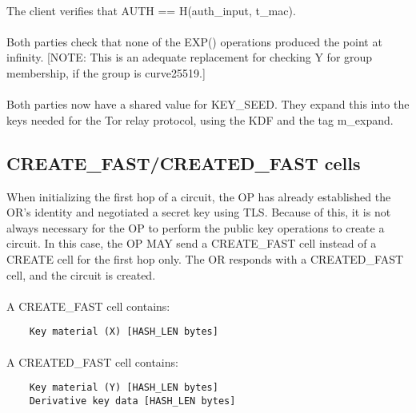 \paragraph{}
The client verifies that AUTH == H(auth\_input, t\_mac).

\paragraph{}
Both parties check that none of the EXP() operations produced the
point at infinity. [NOTE: This is an adequate replacement for
checking Y for group membership, if the group is curve25519.]

\paragraph{}
Both parties now have a shared value for KEY\_SEED. They expand this
into the keys needed for the Tor relay protocol, using the KDF
 and the tag m\_expand.

\subsection{CREATE\_FAST/CREATED\_FAST cells}
When initializing the first hop of a circuit, the OP has already
established the OR's identity and negotiated a secret key using TLS.
Because of this, it is not always necessary for the OP to perform the
public key operations to create a circuit. In this case, the
OP MAY send a CREATE\_FAST cell instead of a CREATE cell for the first
hop only. The OR responds with a CREATED\_FAST cell, and the circuit is
created.

\paragraph{}
A CREATE\_FAST cell contains:

\begin{verbatim}
    Key material (X) [HASH_LEN bytes]
\end{verbatim}

\paragraph{}
A CREATED\_FAST cell contains:

\begin{verbatim}
    Key material (Y) [HASH_LEN bytes]
    Derivative key data [HASH_LEN bytes]
\end{verbatim}

